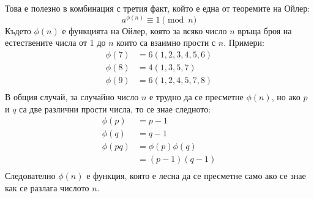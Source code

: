   Това е полезно в комбинация с третия факт, който е една от теоремите на Ойлер:
  \begin{equation}
    a^{\phi(n)} \equiv 1 \pmod{n}
    \label{rsa-euler-theorem}
  \end{equation}
  Където $\phi(n)$ е функцията на Ойлер, която за всяко число $n$ връща броя на естествените числа от 1 до $n$ които са взаимно прости с $n$. Примери:
  \begin{equation}
    \begin{split}
      \phi(7) &= 6 (1,2,3,4,5,6) \\
      \phi(8) &= 4 (1,3,5,7) \\
      \phi(9) &= 6 (1,2,4,5,7,8) \\
    \end{split}
    \label{rsa-euler-function}
  \end{equation}
  В общия случай, за случайно число $n$ е трудно да се пресметне $\phi(n)$, но ако $p$ и $q$ са две различни прости числа, то се знае следното:
  \begin{equation}
    \begin{split}
      \phi(p) &= p-1 \\
      \phi(q) &= q-1 \\
      \phi(pq) &= \phi(p)\phi(q) \\
      &= (p-1)(q-1) \\
    \end{split}
    \label{rsa-phi-calculation}
  \end{equation}
  Следователно $\phi(n)$ е функция, която е лесна да се пресметне само ако се знае как се разлага числото $n$.

